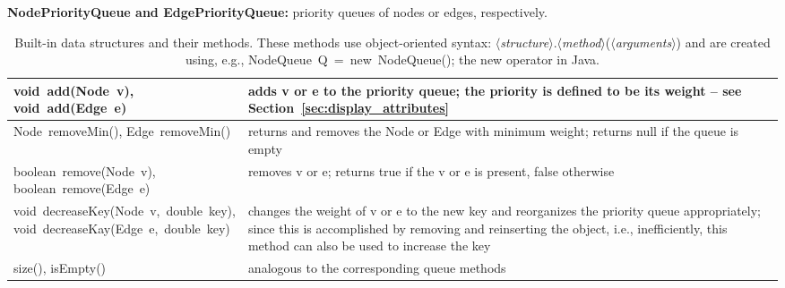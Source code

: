 \begin{table}
  \bigskip
  \textbf{NodePriorityQueue and EdgePriorityQueue:} priority queues of nodes or edges, respectively.

  \medskip
  \begin{tabular}{| m{} | m{} |}
    \hline
    \shortstack[l]{
      \textsf{void~add(Node~v)},\\
      \textsf{void~add(Edge~e)}
    }
    &
    adds \textsf{v} or \textsf{e} to the priority queue;
    the priority is defined to be its weight -- see Section~\ref{sec:display_attributes}
    \\ \hline
    \textsf{Node~removeMin()}, \textsf{Edge~removeMin()}
    &
    returns and removes the \textsf{Node} or \textsf{Edge} with minimum weight;
    returns \textsf{null} if the queue is empty
    \\ \hline
    \hline
    \shortstack[l]{
      \textsf{boolean~remove(Node~v)},\\
      \textsf{boolean~remove(Edge~e)}
    }
    &
    removes \textsf{v} or \textsf{e};
    returns \textsf{true} if the \textsf{v} or \textsf{e} is present,
    \textsf{false} otherwise
    \\ \hline
     \shortstack[l]{
      \textsf{void~decreaseKey(Node~v,~double~key)},\\
      \textsf{void~decreaseKay(Edge~e,~double~key)}
    }
    &
    changes the weight of \textsf{v} or \textsf{e} to the new key
    and reorganizes the priority queue appropriately;
    since this is accomplished by removing and reinserting the object, i.e.,
    inefficiently, this method can also be used to increase the key
    \\ \hline
    \textsf{size()}, \textsf{isEmpty()}
    &
    analogous to the corresponding queue methods
    \\ \hline
  \end{tabular}

  \caption{Built-in data structures and their methods.
     These methods use object-oriented syntax:
$\langle$\emph{structure}$\rangle$.$\langle$\emph{method}$\rangle$($\langle$\emph{arguments}$\rangle$)
    and are created using, e.g.,
    \textsf{NodeQueue~Q~=~new~NodeQueue();} the \textsf{new} operator in Java.
  }
  \label{tab:data_structures}
\end{table}
